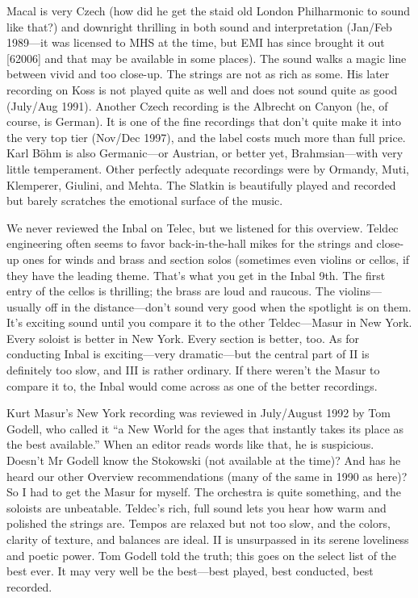 \documentclass[12pt]{article}%
\begin{document}
Macal is very Czech (how did he get the staid old London Philharmonic to sound like that?) and downright thrilling in both sound and interpretation (Jan/Feb 1989---it was licensed to MHS at the time, but EMI has since brought it out [62006] and that may be available in some places). The sound walks a magic line between vivid and too close-up. The strings are not as rich as some. His later recording on Koss is not played quite as well and does not sound quite as good (July/Aug 1991).
Another Czech recording is the Albrecht on Canyon (he, of course, is German). It is one of the fine recordings that don't quite make it into the very top tier (Nov/Dec 1997), and the label costs much more than full price. Karl Böhm is also Germanic---or Austrian, or better yet, Brahmsian---with very little temperament.
Other perfectly adequate recordings were by Ormandy, Muti, Klemperer, Giulini, and Mehta. The Slatkin is beautifully played and
recorded but barely scratches the emotional
surface of the music.

We never reviewed the Inbal on Telec, but we listened for this overview. Teldec engineering often seems to favor back-in-the-hall mikes for the strings and close-up ones for winds and brass and section solos (sometimes even violins or cellos, if they have the leading theme.
That's what you get in the Inbal 9th. The first entry of the cellos is thrilling; the brass are loud and raucous. The violins---usually off in the distance---don't sound very good when the spotlight is on them. It's exciting sound until you compare it to the other Teldec---Masur in New York. Every soloist is better in New York. Every section is better, too. As for conducting Inbal is exciting---very dramatic---but the central part of II is definitely too slow, and III is
rather ordinary. If there weren't the Masur to
compare it to, the Inbal would come across as one of the better recordings.

Kurt Masur's New York recording was reviewed in July/August 1992 by Tom Godell, who called it ``a New World for the ages that instantly takes its place as the best available.'' When an editor reads words like that,
he is suspicious. Doesn't Mr Godell know the Stokowski (not available at the time)? And has he heard our other Overview recommendations (many of the same in 1990 as here)? So I had to get the Masur for myself. The orchestra is quite something, and the soloists are unbeatable.
Teldec's rich, full sound lets you hear how warm and polished the strings are. Tempos are relaxed but not too slow, and the colors, clarity of texture, and balances are ideal. II is unsurpassed in its serene loveliness and poetic power. Tom Godell told the truth; this goes on the select list of the best ever. It may very well be the best---best played, best conducted, best
recorded.
\end{document}
